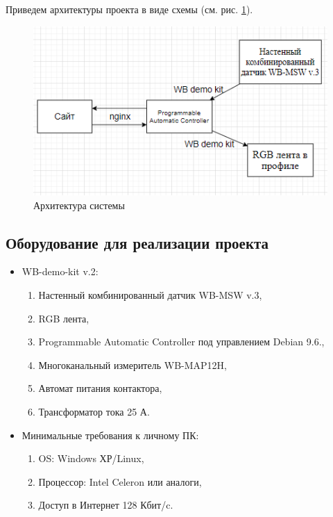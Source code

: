 \documentclass[a4paper,14pt]{extarticle}
\begin{document}
Приведем архитектуры проекта в виде схемы (см. рис. \ref{fig:architecture}).
\begin{figure}[htbp]
	\centering
	\includegraphics[width=0.5\linewidth]{images/architecture}
	\caption{Архитектура системы}
	\label{fig:architecture}
\end{figure}
\newpage
\subsection{Оборудование для реализации проекта}
\begin{itemize}
	\item WB-demo-kit v.2:
\begin{enumerate}
	\item Настенный комбинированный датчик WB-MSW v.3,
	\item RGB лента,
	\item Programmable Automatic Controller под управлением Debian 9.6.,
	\item Многоканальный измеритель WB-MAP12H,
	\item Автомат питания контактора,
	\item Трансформатор тока 25 А.
\end{enumerate}
	\item Минимальные требования к личному ПК:
	\begin{enumerate}
		\item OS: Windows ХР/Linux,
		\item Процессор: Intel Celeron или аналоги,
		\item Доступ в Интернет 128 Кбит/c.
	\end{enumerate}
\fi
\end{itemize}
\end{document}
